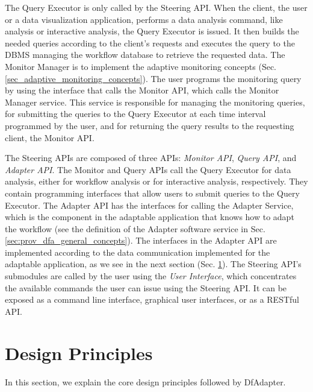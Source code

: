 The Query Executor is only called by the Steering API. When the client, \ie{} the user or a data visualization application, performs a data analysis command, like analysis or interactive analysis, the Query Executor is issued.
It then builds the needed queries according to the client's requests and executes the query to the DBMS managing the
workflow database to retrieve the requested data. The Monitor Manager is to implement the adaptive monitoring concepts (Sec. \ref{sec_adaptive_monitoring_concepts}). The user programs the monitoring query by using the interface that calls the Monitor API, which calls the Monitor Manager service. This service is responsible for managing the monitoring queries, for submitting the queries to the Query Executor at each time interval programmed by the user, and for returning the query results to the requesting client, \ie{} the Monitor API.


The Steering APIs are composed of three APIs: \textit{Monitor API}, \textit{Query API}, and \textit{Adapter API}.
The Monitor and Query APIs call the Query Executor for data analysis, either for workflow analysis or for interactive analysis, respectively.
They contain programming interfaces that allow users to submit queries to the Query Executor.
The Adapter API has the interfaces for calling the Adapter Service, which is the component in the adaptable application that knows how to adapt the workflow (see the definition of the Adapter software service in Sec. \ref{sec:prov_dfa_general_concepts}).
The interfaces in the Adapter API are implemented according to the data communication implemented for the adaptable application, as we see in the next section (Sec. \ref{wfscript_system-design-principles}).
The Steering API's submodules are called by the user using the \textit{User Interface}, which concentrates the available commands the user can issue using the Steering API. It can be exposed as a command line interface, graphical user interfaces, or as a RESTful API.


\section{Design Principles}
\label{wfscript_system-design-principles}

In this section, we explain the core design principles followed
by DfAdapter.

